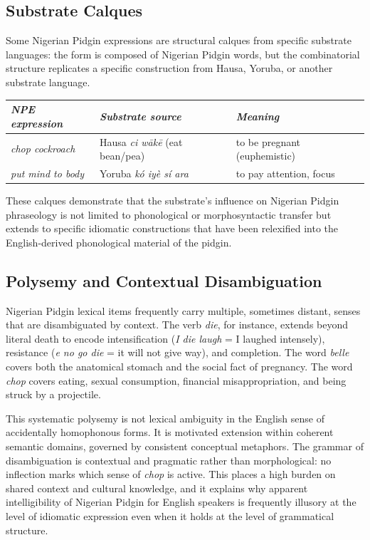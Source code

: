 \documentclass[12pt]{article}
\begin{document}
\subsection{Substrate Calques}

Some Nigerian Pidgin expressions are structural calques from specific substrate languages: the form is composed of Nigerian Pidgin words, but the combinatorial structure replicates a specific construction from Hausa, Yoruba, or another substrate language.

\begin{center}
\begin{tabular}{lll}
\textit{NPE expression} & \textit{Substrate source} & \textit{Meaning} \\
\hline
\textit{chop cockroach} & Hausa \textit{ci wākē} (eat bean/pea) & to be pregnant (euphemistic) \\
\textit{put mind to body} & Yoruba \textit{kó iyè sí ara} & to pay attention, focus \\
\end{tabular}
\end{center}

These calques demonstrate that the substrate's influence on Nigerian Pidgin phraseology is not limited to phonological or morphosyntactic transfer but extends to specific idiomatic constructions that have been relexified into the English-derived phonological material of the pidgin.

\subsection{Polysemy and Contextual Disambiguation}

Nigerian Pidgin lexical items frequently carry multiple, sometimes distant, senses that are disambiguated by context. The verb \textit{die}, for instance, extends beyond literal death to encode intensification (\textit{I die laugh} = I laughed intensely), resistance (\textit{e no go die} = it will not give way), and completion. The word \textit{belle} covers both the anatomical stomach and the social fact of pregnancy. The word \textit{chop} covers eating, sexual consumption, financial misappropriation, and being struck by a projectile.

This systematic polysemy is not lexical ambiguity in the English sense of accidentally homophonous forms. It is motivated extension within coherent semantic domains, governed by consistent conceptual metaphors. The grammar of disambiguation is contextual and pragmatic rather than morphological: no inflection marks which sense of \textit{chop} is active. This places a high burden on shared context and cultural knowledge, and it explains why apparent intelligibility of Nigerian Pidgin for English speakers is frequently illusory at the level of idiomatic expression even when it holds at the level of grammatical structure.
\end{document}
